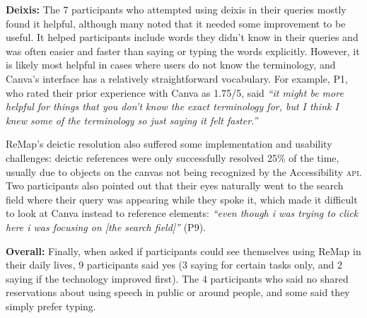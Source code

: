\textbf{Deixis:}
The 7 participants who attempted using deixis in their queries mostly found it helpful, although many noted that it needed some improvement to be useful. It helped participants include words they didn't know in their queries and was often easier and faster than saying or typing the words explicitly. However, it is likely most helpful in cases where users do not know the terminology, and Canva's interface has a relatively straightforward vocabulary. For example, P1, who rated their prior experience with Canva as 1.75/5, said \textit{``it might be more helpful for things that you don't know the exact terminology for, but I think I knew some of the terminology so just saying it felt faster.''}

ReMap's deictic resolution also suffered some implementation and usability challenges: deictic references were only successfully resolved 25\% of the time, usually due to objects on the canvas not being recognized by the Accessibility \textsc{api}. Two participants also pointed out that their eyes naturally went to the search field where their query was appearing while they spoke it, which made it difficult to look at Canva instead to reference elements: \textit{``even though i was trying to click here i was focusing on [the search field]''} (P9).

\textbf{Overall:}
Finally, when asked if participants could see themselves using ReMap in their daily lives, 9 participants said yes (3 saying for certain tasks only, and 2 saying if the technology improved first). The 4 participants who said no shared reservations about using speech in public or around people, and some said they simply prefer typing.
